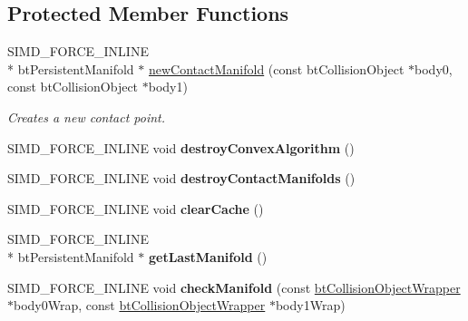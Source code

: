 \subsection*{Protected Member Functions}
\begin{DoxyCompactItemize}
\item 
\hypertarget{classbt_g_impact_collision_algorithm_a39b6aae298182026902401b138ebd716}{S\+I\+M\+D\+\_\+\+F\+O\+R\+C\+E\+\_\+\+I\+N\+L\+I\+N\+E \\*
bt\+Persistent\+Manifold $\ast$ \hyperlink{classbt_g_impact_collision_algorithm_a39b6aae298182026902401b138ebd716}{new\+Contact\+Manifold} (const bt\+Collision\+Object $\ast$body0, const bt\+Collision\+Object $\ast$body1)}\label{classbt_g_impact_collision_algorithm_a39b6aae298182026902401b138ebd716}

\begin{DoxyCompactList}\small\item\em Creates a new contact point. \end{DoxyCompactList}\item 
\hypertarget{classbt_g_impact_collision_algorithm_a6fba8aeaadd20c3d882f20088fbeffdc}{S\+I\+M\+D\+\_\+\+F\+O\+R\+C\+E\+\_\+\+I\+N\+L\+I\+N\+E void {\bfseries destroy\+Convex\+Algorithm} ()}\label{classbt_g_impact_collision_algorithm_a6fba8aeaadd20c3d882f20088fbeffdc}

\item 
\hypertarget{classbt_g_impact_collision_algorithm_a5d5bc255d50740600f6b112b29450c3f}{S\+I\+M\+D\+\_\+\+F\+O\+R\+C\+E\+\_\+\+I\+N\+L\+I\+N\+E void {\bfseries destroy\+Contact\+Manifolds} ()}\label{classbt_g_impact_collision_algorithm_a5d5bc255d50740600f6b112b29450c3f}

\item 
\hypertarget{classbt_g_impact_collision_algorithm_a915bad958b4e36822919ff4f0be0bea6}{S\+I\+M\+D\+\_\+\+F\+O\+R\+C\+E\+\_\+\+I\+N\+L\+I\+N\+E void {\bfseries clear\+Cache} ()}\label{classbt_g_impact_collision_algorithm_a915bad958b4e36822919ff4f0be0bea6}

\item 
\hypertarget{classbt_g_impact_collision_algorithm_a3b50268a08d3ffe3f95f95f52997c57f}{S\+I\+M\+D\+\_\+\+F\+O\+R\+C\+E\+\_\+\+I\+N\+L\+I\+N\+E \\*
bt\+Persistent\+Manifold $\ast$ {\bfseries get\+Last\+Manifold} ()}\label{classbt_g_impact_collision_algorithm_a3b50268a08d3ffe3f95f95f52997c57f}

\item 
\hypertarget{classbt_g_impact_collision_algorithm_afc77fd957d38e96422e9fea0f645ad16}{S\+I\+M\+D\+\_\+\+F\+O\+R\+C\+E\+\_\+\+I\+N\+L\+I\+N\+E void {\bfseries check\+Manifold} (const \hyperlink{structbt_collision_object_wrapper}{bt\+Collision\+Object\+Wrapper} $\ast$body0\+Wrap, const \hyperlink{structbt_collision_object_wrapper}{bt\+Collision\+Object\+Wrapper} $\ast$body1\+Wrap)}\label{classbt_g_impact_collision_algorithm_afc77fd957d38e96422e9fea0f645ad16}


\end{DoxyCompactItemize}
